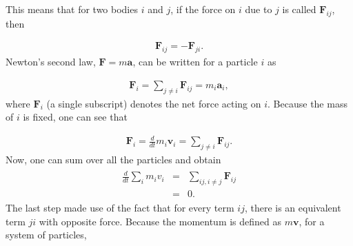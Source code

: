 \documentclass[letterpaper,10pt,english]{sphinxmanual}
\begin{document}
This means that for two bodies \(i\) and \(j\), if the force on \(i\) due to \(j\) is called \(\boldsymbol{F}_{ij}\), then




\begin{equation*}
\begin{split}
\begin{equation}
\boldsymbol{F}_{ij}=-\boldsymbol{F}_{ji}. 
\label{_auto4} \tag{4}
\end{equation}
\end{split}
\end{equation*}
Newton’s second law, \(\boldsymbol{F}=m\boldsymbol{a}\), can be written for a particle \(i\) as




\begin{equation*}
\begin{split}
\begin{equation}
\boldsymbol{F}_i=\sum_{j\ne i} \boldsymbol{F}_{ij}=m_i\boldsymbol{a}_i,
\label{_auto5} \tag{5}
\end{equation}
\end{split}
\end{equation*}
where \(\boldsymbol{F}_i\) (a single subscript) denotes the net force acting on \(i\). Because the mass of \(i\) is fixed, one can see that




\begin{equation*}
\begin{split}
\begin{equation}
\boldsymbol{F}_i=\frac{d}{dt}m_i\boldsymbol{v}_i=\sum_{j\ne i}\boldsymbol{F}_{ij}.
\label{_auto6} \tag{6}
\end{equation}
\end{split}
\end{equation*}
Now, one can sum over all the particles and obtain
\begin{equation*}
\begin{split}
\begin{eqnarray}
\frac{d}{dt}\sum_i m_iv_i&=&\sum_{ij, i\ne j}\boldsymbol{F}_{ij}\\
\nonumber
&=&0.
\end{eqnarray}
\end{split}
\end{equation*}
The last step made use of the fact that for every term \(ij\), there is
an equivalent term \(ji\) with opposite force. Because the momentum is
defined as \(m\boldsymbol{v}\), for a system of particles,
\end{document}
